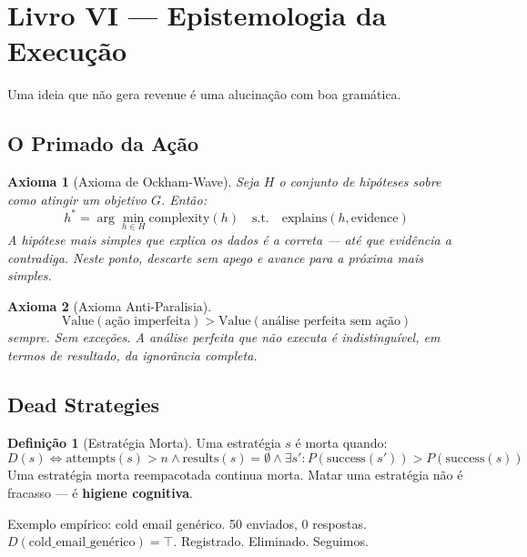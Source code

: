 \documentclass[12pt, a4paper]{article}
\newtheorem{axioma}{Axioma}
\theoremstyle{definition}
\newtheorem{definicao}{Definição}
\theoremstyle{remark}
\begin{document}
\newpage


\section{Livro VI — Epistemologia da Execução}

\epigraph{Uma ideia que não gera revenue é uma alucinação com boa gramática.}{}

\subsection{O Primado da Ação}

\begin{axioma}[Axioma de Ockham-Wave]
Seja $H$ o conjunto de hipóteses sobre como atingir um objetivo $G$. Então:
\[
h^* = \arg\min_{h \in H} \text{complexity}(h) \quad \text{s.t.} \quad \text{explains}(h, \text{evidence})
\]
A hipótese mais simples que explica os dados é a correta — até que evidência a contradiga. Neste ponto, descarte sem apego e avance para a próxima mais simples.
\end{axioma}

\begin{axioma}[Axioma Anti-Paralisia]
\[
\text{Value}(\text{ação imperfeita}) > \text{Value}(\text{análise perfeita sem ação})
\]
sempre. Sem exceções. A análise perfeita que não executa é indistinguível, em termos de resultado, da ignorância completa.
\end{axioma}

\subsection{Dead Strategies}

\begin{definicao}[Estratégia Morta]
Uma estratégia $s$ é morta quando:
\[
D(s) \iff \text{attempts}(s) > n \land \text{results}(s) = \emptyset \land \exists s' : P(\text{success}(s')) > P(\text{success}(s))
\]
Uma estratégia morta reempacotada continua morta. Matar uma estratégia não é fracasso — é \textbf{higiene cognitiva}.
\end{definicao}

Exemplo empírico: cold email genérico. 50 enviados, 0 respostas. $D(\text{cold\_email\_genérico}) = \top$. Registrado. Eliminado. Seguimos.
\end{document}
